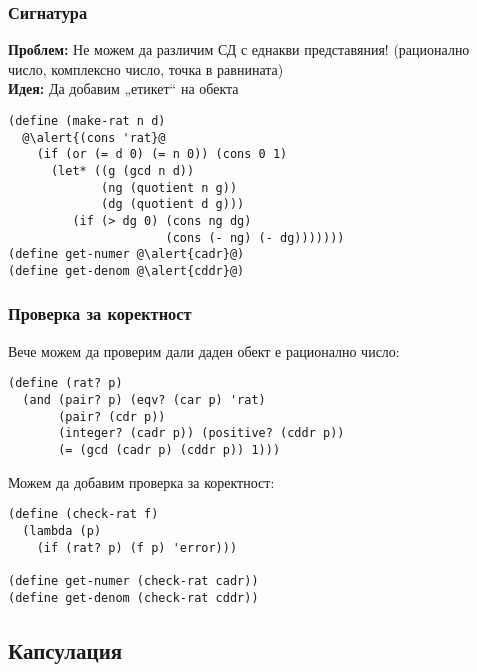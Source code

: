 \documentclass[alsotrans,beameroptions={aspectratio=169}]{beamerswitch}
\begin{document}
\begin{frame}[fragile]
  \frametitle{Сигнатура}

  \sizeboth\footnotesize
  \textbf{Проблем:} Не можем да различим СД с еднакви представяния! (рационално число, комплексно число, точка в равнината)\\
  \pause
  \textbf{Идея:} Да добавим „етикет“ на обекта
  \begin{center}
  \end{center}
  \pause
  \vspace{-.5ex}
\begin{lstlisting}
(define (make-rat n d)
  @\alert{(cons 'rat}@
    (if (or (= d 0) (= n 0)) (cons 0 1)
      (let* ((g (gcd n d))
             (ng (quotient n g))
             (dg (quotient d g)))
         (if (> dg 0) (cons ng dg)
                      (cons (- ng) (- dg)))))))
(define get-numer @\alert{cadr}@)
(define get-denom @\alert{cddr}@)
\end{lstlisting}
\end{frame}

\begin{frame}[fragile]
  \frametitle{Проверка за коректност}

  Вече можем да проверим дали даден обект е рационално число:
\begin{lstlisting}
(define (rat? p)
  (and (pair? p) (eqv? (car p) 'rat)
       (pair? (cdr p))
       (integer? (cadr p)) (positive? (cddr p))
       (= (gcd (cadr p) (cddr p)) 1)))
\end{lstlisting}
  \pause
  Можем да добавим проверка за коректност:
\begin{lstlisting}
(define (check-rat f)
  (lambda (p)
    (if (rat? p) (f p) 'error)))

(define get-numer (check-rat cadr))
(define get-denom (check-rat cddr))
\end{lstlisting}
\end{frame}

\subsection{Капсулация}
\end{document}

